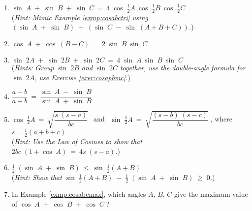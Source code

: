 {\begin{enumerate}[\bfseries 1.]
\begin{displaymath}
   p(t) ~=~ \tfrac{1}{2}\,V_m \; I_m \;\cos\;(\theta - \phi) ~+~
    \tfrac{1}{2}\,V_m \; I_m \;\cos\;(2\omega t + \theta + \phi) ~.
  \end{displaymath}
 For Exercises \ref{exer:tri34start}-\ref{exer:tri34end}, prove the given identity or inequality
 for any triangle $\triangle\,ABC$.
 [{[\bfseries 1.]}]
 \item\label{exer:tri34start} $\sin\;A \;+\; \sin\;B \;+\; \sin\;C ~=~ 
  4\;\cos\;\tfrac{1}{2}A~\cos\;\tfrac{1}{2}B~\cos\;\tfrac{1}{2}C$\\ (\emph{Hint: Mimic Example
  \ref{exmp:cosabctri} using $(\sin\;A \;+\; \sin\;B) \;+\; (\sin\;C \;-\; \sin\;(A+B+C))$.})
 \item\label{exer:cosapbmc} $\cos\;A \;+\; \cos\;(B-C) ~=~ 2\;\sin\;B~\sin\;C$
 \item $\sin\;2A \;+\; \sin\;2B \;+\; \sin\;2C ~=~ 4\;\sin\;A~\sin\;B~\sin\;C$\\ (\emph{Hints: Group
  $\sin\;2B$ and $\sin\;2C$ together, use the double-angle formula for $\sin\;2A$, use Exercise
  \ref{exer:cosapbmc}.})
 \item $\dfrac{a-b}{a+b} ~=~ \dfrac{\sin\;A \;-\; \sin\;B}{\sin\;A \;+\; \sin\;B}$
 \item $\cos\;\tfrac{1}{2}A ~=~ \sqrt{\dfrac{s\;(s-a)}{bc}}~~$ and
  $~~\sin\;\tfrac{1}{2}A ~=~ \sqrt{\dfrac{(s-b)\;(s-c)}{bc}}\;$, \;where
  $s=\tfrac{1}{2}(a+b+c)$\\ (\emph{Hint: Use the Law of Cosines to show that $2bc\;(1 + \cos\;A) ~=~
  4s\;(s-a)$.})
 \item\label{exer:tri34end} $\tfrac{1}{2}\;(\sin\;A \;+\; \sin\;B) ~\le~
  \sin\;\tfrac{1}{2}(A+B)$\\ (\emph{Hint: Show that $\sin\;\tfrac{1}{2}(A+B) \;-\;
  \tfrac{1}{2}\;(\sin\;A \;+\; \sin\;B) \;\ge\; 0$.})
 \item In Example \ref{exmp:cosabcmax}, which angles $A$, $B$, $C$ give the maximum value of
  $\cos\;A \;+\; \cos\;B \;+\; \cos\;C\;$?
\end{enumerate}}
